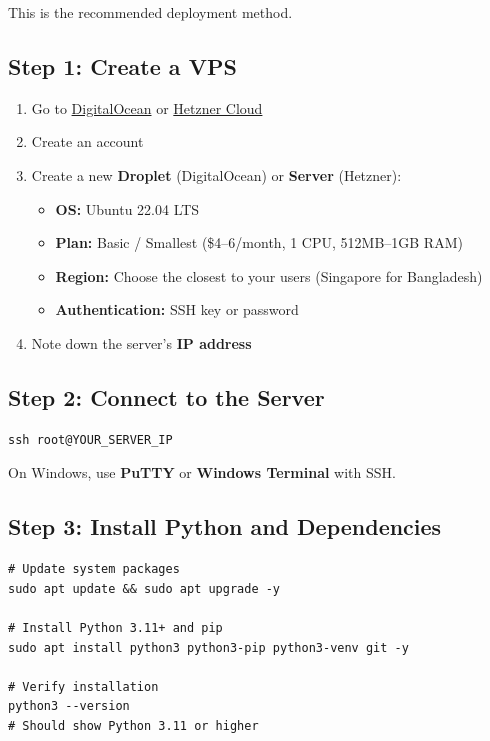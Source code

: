This is the recommended deployment method.

\subsection{Step 1: Create a VPS}

\begin{enumerate}
    \item Go to \href{https://www.digitalocean.com}{DigitalOcean} or \href{https://www.hetzner.com/cloud}{Hetzner Cloud}
    \item Create an account
    \item Create a new \textbf{Droplet} (DigitalOcean) or \textbf{Server} (Hetzner):
    \begin{itemize}
        \item \textbf{OS:} Ubuntu 22.04 LTS
        \item \textbf{Plan:} Basic / Smallest (\$4--6/month, 1 CPU, 512MB--1GB RAM)
        \item \textbf{Region:} Choose the closest to your users (Singapore for Bangladesh)
        \item \textbf{Authentication:} SSH key or password
    \end{itemize}
    \item Note down the server's \textbf{IP address}
\end{enumerate}

\subsection{Step 2: Connect to the Server}

\begin{lstlisting}[style=bashstyle, title=Connect via SSH]
ssh root@YOUR_SERVER_IP
\end{lstlisting}

On Windows, use \textbf{PuTTY} or \textbf{Windows Terminal} with SSH.

\subsection{Step 3: Install Python and Dependencies}

\begin{lstlisting}[style=bashstyle, title=Server Setup Commands]
# Update system packages
sudo apt update && sudo apt upgrade -y

# Install Python 3.11+ and pip
sudo apt install python3 python3-pip python3-venv git -y

# Verify installation
python3 --version
# Should show Python 3.11 or higher
\end{lstlisting}


